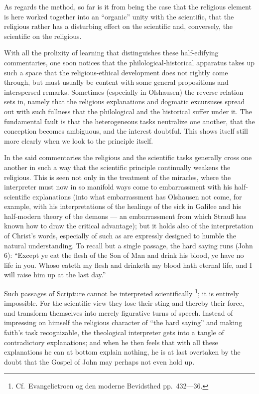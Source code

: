 \documentclass[12pt,a4paper]{book}
\begin{document}
As regards the method, so far is it from being the case that the religious element is
here worked together into an ``organic'' unity with the scientific, that the religious
rather has a disturbing effect on the scientific and, conversely, the scientific on
the religious.

With all the prolixity of learning that distinguishes these half-edifying
commentaries, one soon notices that the philological-historical apparatus takes up
such a space that the religious-ethical development does not rightly come through, but
must usually be content with some general propositions and interspersed remarks.
Sometimes (especially in Olshausen) the reverse relation sets in, namely that the
religious explanations and dogmatic excursuses spread out with such fullness that the
philological and the historical suffer under it. The fundamental fault is that the
heterogeneous tasks neutralize one another, that the conception becomes ambiguous, and
the interest doubtful. This shows itself still more clearly when we look to the
principle itself.

In the said commentaries the religious and the scientific tasks generally cross one
another in such a way that the scientific principle continually weakens the religious.
This is seen not only in
the treatment of the miracles, where the interpreter must now in so manifold ways come
to embarrassment with his half-scientific explanations (into what embarrassment has
Olshausen not come, for example, with his interpretations of the healings of the sick
in Galilee and his half-modern theory of the demons --- an embarrassment from which
Strauß has known how to draw the critical advantage); but it holds also of the
interpretation of Christ's words, especially of such as are expressly designed to
humble the natural understanding. To recall but a single passage, the hard saying runs
(John 6): ``Except ye eat the flesh of the Son of Man and drink his blood, ye have no
life in you. Whoso eateth my flesh and drinketh my blood hath eternal life, and I will
raise him up at the last day.''

Such passages of Scripture cannot be interpreted scientifically%
\footnote{Cf.\ Evangelietroen og den moderne Bevidsthed pp.\ 432---36.}; it is entirely
impossible. For the scientific view they lose their sting and thereby their force, and
transform themselves into merely figurative turns of speech. Instead of impressing on
himself the religious character of ``the hard saying'' and making faith's task
recognizable, the theological interpreter gets into a tangle of contradictory
explanations; and when he then feels that with all these explanations he can at bottom
explain nothing, he is at last overtaken by the doubt that the Gospel of John may
perhaps not even hold up.
\end{document}
